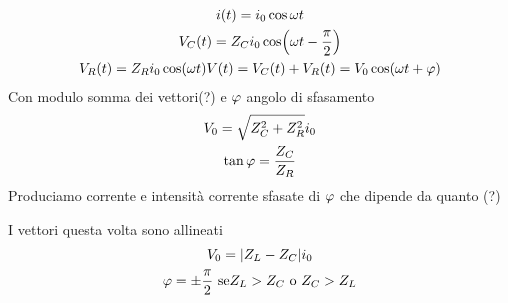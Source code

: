 \begin{examplewt}[AC, serie RC]
	\begin{gather*}
		i(t)=i_0\cos\omega t\\
		V_C(t)=Z_Ci_0\cos(\omega t-\frac{\pi}{2})\\
		V_R(t)=Z_R i_0\cos(\omega t)	
		V(t)=V_C(t) +V_R(t)=  V_0\cos(\omega t+\oldphi)
	\end{gather*}
	Con modulo somma dei vettori(?) e $\oldphi$ angolo di sfasamento
	\begin{gather*}
		V_0=\sqrt{Z_C^2 +Z_R^2} i_0\\
		\tan\oldphi=\frac{Z_C}{Z_R}
	\end{gather*}
Produciamo corrente e intensità corrente sfasate di $\oldphi$ che dipende da quanto	(?)
\end{examplewt}

\begin{examplewt}[AC, serie LC]
	I vettori questa volta sono allineati
	\begin{gather*}
		V_0=\abs{Z_L-Z_C}i_0\\
		\oldphi=\pm\frac{\pi}{2} \text{ se}  Z_L>Z_C \text{ o } Z_C>Z_L
	\end{gather*}
\end{examplewt}

